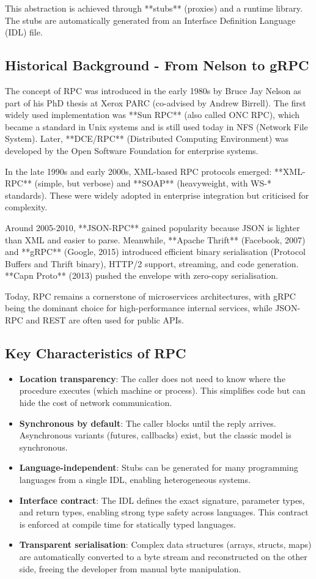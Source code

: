 \documentclass[a4paper]{article}
\begin{document}
This abstraction is achieved through **stubs** (proxies) and a runtime library. The stubs are automatically generated from an Interface Definition Language (IDL) file.

\subsection{Historical Background - From Nelson to gRPC}
The concept of RPC was introduced in the early 1980s by Bruce Jay Nelson as part of his PhD thesis at Xerox PARC (co-advised by Andrew Birrell). The first widely used implementation was **Sun RPC** (also called ONC RPC), which became a standard in Unix systems and is still used today in NFS (Network File System). Later, **DCE/RPC** (Distributed Computing Environment) was developed by the Open Software Foundation for enterprise systems.

In the late 1990s and early 2000s, XML-based RPC protocols emerged: **XML-RPC** (simple, but verbose) and **SOAP** (heavyweight, with WS-* standards). These were widely adopted in enterprise integration but criticised for complexity.

Around 2005-2010, **JSON-RPC** gained popularity because JSON is lighter than XML and easier to parse. Meanwhile, **Apache Thrift** (Facebook, 2007) and **gRPC** (Google, 2015) introduced efficient binary serialisation (Protocol Buffers and Thrift binary), HTTP/2 support, streaming, and code generation. **Capn Proto** (2013) pushed the envelope with zero-copy serialisation.

Today, RPC remains a cornerstone of microservices architectures, with gRPC being the dominant choice for high-performance internal services, while JSON-RPC and REST are often used for public APIs.

\subsection{Key Characteristics of RPC}
\begin{itemize}
    \item \textbf{Location transparency}: The caller does not need to know where the procedure executes (which machine or process). This simplifies code but can hide the cost of network communication.
    \item \textbf{Synchronous by default}: The caller blocks until the reply arrives. Asynchronous variants (futures, callbacks) exist, but the classic model is synchronous.
    \item \textbf{Language-independent}: Stubs can be generated for many programming languages from a single IDL, enabling heterogeneous systems.
    \item \textbf{Interface contract}: The IDL defines the exact signature, parameter types, and return types, enabling strong type safety across languages. This contract is enforced at compile time for statically typed languages.
    \item \textbf{Transparent serialisation}: Complex data structures (arrays, structs, maps) are automatically converted to a byte stream and reconstructed on the other side, freeing the developer from manual byte manipulation.
\end{itemize}
\end{document}

